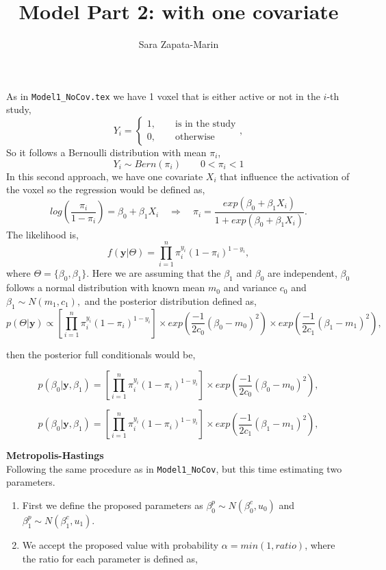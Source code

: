 \documentclass[10pt,a4paper]{article}
\author{Sara Zapata-Marin}
\title{Model Part 2: with one covariate}
\begin{document}
\maketitle

As in \texttt{Model1\_NoCov.tex} we have 1 voxel that is either active or not in the $i$-th study,
\[ Y_i= 
\begin{cases}
1,\qquad \text{is in the study}\\
0, \qquad \text{otherwise}
\end{cases},
\]
So it follows a Bernoulli distribution with mean $\pi_i$,
\[Y_i \sim Bern(\pi_i) \qquad 0<\pi_i <1\]
In this second approach, we have one covariate $X_i$ that influence the activation of the voxel so the regression would be defined as,
\[ log \left(\dfrac{\pi_i}{1-\pi_i} \right)=\beta_0+\beta_1 X_{i} \quad \Rightarrow  \quad \pi_i = \dfrac{exp(\beta_0+\beta_1 X_{i}) }{1+ exp(\beta_0+\beta_1 X_{i} )}. \]
The likelihood is,
\[ f(\textbf{y}| \Theta)=\prod_{i=1}^{n} \pi_i^{y_i}(1-\pi_i)^{1-y_i},\]
where $\Theta =\{ \beta_0, \beta_{1}\}$. Here we are assuming that the $\beta_1$ and $\beta_0$  are independent, $\beta_0$ follows a normal distribution with known mean $m_0$ and variance $c_0$ and $\beta_1 \sim N(m_1, c_1), $ 
and the posterior distribution defined as,
\[p(\Theta|\textbf{y})\propto \left[ \prod_{i=1}^{n} \pi_i^{y_i}(1-\pi_i)^{1-y_i} \right] \times exp\left(\dfrac{-1}{2c_0}(\beta_0-m_0)^2\right) \times exp \left( \dfrac{-1}{2c_1} (\beta_1-m_1)^2\right), \]

then the posterior full conditionals would be,

\[p(\beta_0|\textbf{y}, \beta_1)= \left[ \prod_{i=1}^{n} \pi_i^{y_i}(1-\pi_i)^{1-y_i} \right] \times exp\left(\dfrac{-1}{2c_0}(\beta_0-m_0)^2\right),\]

\[p(\beta_0|\textbf{y}, \beta_1)= \left[ \prod_{i=1}^{n} \pi_i^{y_i}(1-\pi_i)^{1-y_i} \right] \times exp\left(\dfrac{-1}{2c_1}(\beta_1-m_1)^2\right),\]

\textbf{Metropolis-Hastings}
\\Following the same procedure as in \texttt{Model1\_NoCov}, but this time estimating two
 parameters.
 
\begin{enumerate}
\item First we define the proposed parameters as $\beta_0^p \sim N(\beta_0^c,u_0)$ and $\beta_1^p \sim N(\beta_1^c,u_1)$.
\item We accept the proposed value with probability $\alpha = min(1, ratio)$, where the ratio for each parameter is defined as,
\end{enumerate}
  
\end{document}
